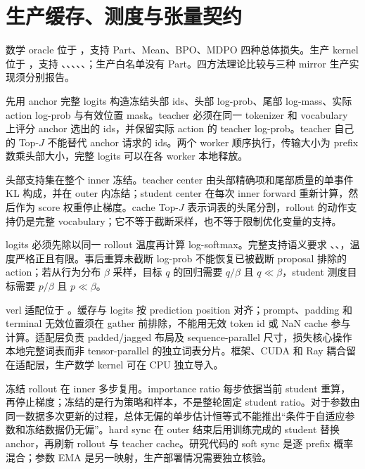 \documentclass[lang=cn,scheme=chinese,openany]{../book/elegantbook}
\begin{document}
\section{生产缓存、测度与张量契约}
\label{opd:production-contract}

数学 oracle 位于 ，支持 Part、Mean、BPO、MDPO 四种总体损失。生产 kernel 位于 ，支持 、、、、、；生产白名单没有 Part。四方法理论比较与三种 mirror 生产实现须分别报告。

 先用 anchor 完整 logits 构造冻结头部 ids、头部 log-prob、尾部 log-mass、实际 action log-prob 与有效位置 mask。teacher 必须在同一 tokenizer 和 vocabulary 上评分 anchor 选出的 ids，并保留实际 action 的 teacher log-prob。teacher 自己的 Top-$J$ 不能替代 anchor 请求的 ids。两个 worker 顺序执行，传输大小为 prefix 数乘头部大小，完整 logits 可以在各 worker 本地释放。

头部支持集在整个 inner 冻结。teacher center 由头部精确项和尾部质量的单事件 KL 构成，并在 outer 内冻结；student center 在每次 inner forward 重新计算，然后作为 score 权重停止梯度。cache Top-$J$ 表示词表的头尾分割，rollout 的动作支持仍是完整 vocabulary；它不等于截断采样，也不等于限制优化变量的支持。

logits 必须先除以同一 rollout 温度再计算 log-softmax。完整支持语义要求 、、，温度严格正且有限。事后重算未截断 log-prob 不能恢复已被截断 proposal 排除的 action；若从行为分布 $\beta$ 采样，目标 $q$ 的回归需要 $q/\beta$ 且 $q\ll\beta$，student 测度目标需要 $p/\beta$ 且 $p\ll\beta$。

verl 适配位于 。缓存与 logits 按 prediction position 对齐；prompt、padding 和 terminal 无效位置须在 gather 前排除，不能用无效 token id 或 NaN cache 参与计算。适配层负责 padded/jagged 布局及 sequence-parallel 尺寸，损失核心操作本地完整词表而非 tensor-parallel 的独立词表分片。框架、CUDA 和 Ray 耦合留在适配层，生产数学 kernel 可在 CPU 独立导入。

冻结 rollout 在 inner 多步复用。importance ratio 每步依据当前 student 重算，再停止梯度；冻结的是行为策略和样本，不是整轮固定 student ratio。对于参数由同一数据多次更新的过程，总体无偏的单步估计恒等式不能推出“条件于自适应参数和冻结数据仍无偏”。hard sync 在 outer 结束后用训练完成的 student 替换 anchor，再刷新 rollout 与 teacher cache。研究代码的 soft sync 是逐 prefix 概率混合；参数 EMA 是另一映射，生产部署情况需要独立核验。
\end{document}
